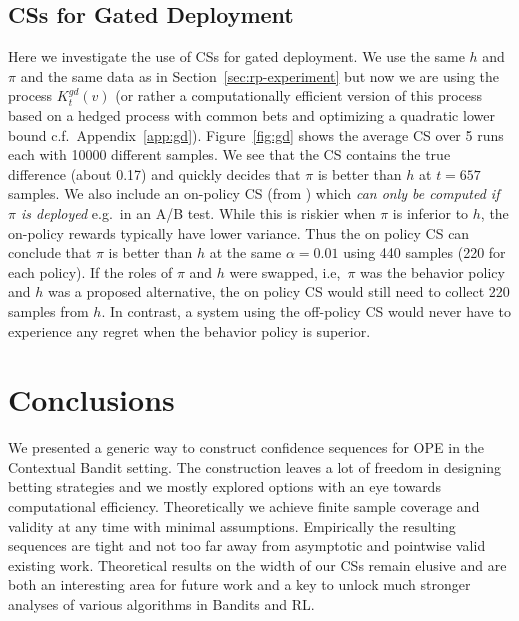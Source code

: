 \subsection{CSs for Gated Deployment}
Here we investigate the use of CSs for gated deployment. 
We use the same $h$ and $\pi$ and the same data as 
in Section~\ref{sec:rp-experiment} but now we are 
using the process $K_t^{gd}(v)$ 
(or rather a computationally efficient version 
of this process based on a hedged process with 
common bets and optimizing a quadratic lower bound
c.f.\ Appendix~\ref{app:gd}).
Figure~\ref{fig:gd} shows the average CS over 5 runs
each with 10000 different samples. We see that the 
CS contains the true difference (about 0.17) and quickly
decides that $\pi$ is better than $h$ at $t=657$ samples.
We also include an on-policy CS (from \cite{waudby-smith_variance-adaptive_2020}) which
\emph{can only be computed if $\pi$ is deployed} 
e.g.\ in an A/B test. While this is riskier 
when $\pi$ is inferior to $h$, the on-policy rewards 
typically have lower variance. Thus the on policy CS can 
conclude that $\pi$ is better than $h$ at the 
same $\alpha=0.01$ using 440 samples 
(220 for each policy). If the roles of 
$\pi$ and $h$ were swapped, i.e,\ $\pi$ was the 
behavior policy and $h$ was a proposed alternative,
the on policy CS would still need to collect 220
samples from $h$. In contrast, a system using the off-policy CS 
would never have to experience any regret when 
the behavior policy is superior.


\section{Conclusions}
We presented a generic way to construct confidence sequences 
for OPE in the Contextual Bandit setting. The construction leaves 
a lot of freedom in designing betting strategies and we mostly 
explored options with an eye towards computational
efficiency. Theoretically we achieve finite sample coverage 
and validity at any time with minimal assumptions. Empirically
the resulting sequences are tight and not too far away from asymptotic 
and pointwise valid existing work. Theoretical results on the 
width of our CSs remain elusive and are both an interesting 
area for future work and a key to unlock much stronger 
analyses of various algorithms in Bandits and RL.

\newpage




\onecolumn
\appendix


